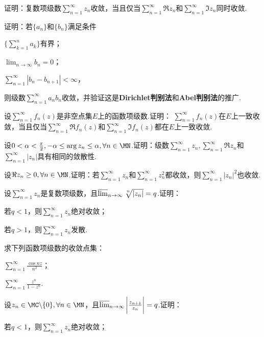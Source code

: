 \begin{xiti}
\item 证明：复数项级数$\sum_{n=1}^\infty z_n$收敛，当且仅当$\sum_{n=1}^\infty \Re  z_n$和$\sum_{n=1}^\infty \Im z_n$同时收敛.
\item 证明：若$\{a_n\}$和$\{b_n\}$满足条件
\begin{enuma}
  \item $\bigg\{\sum_{k=1}^n a_k\bigg\}$有界；
  \item $\lim_{n\to\infty}b_n=0$；
  \item $\sum_{n=1}^\infty|b_n-b_{n+1}|<\infty$，
\end{enuma}
则级数$\sum_{n=1}^\infty a_nb_n$收敛，并验证这是\textbf{Dirichlet判别法}和\textbf{Abel判别法}的推广.
\item 设$\sum_{n=1}^\infty f_n(z)$是非空点集$E$上的函数项级数.证明：
$\sum_{n=1}^\infty f_n(z)$在$E$上一致收敛，当且仅当$\sum_{n=1}^\infty\Re f_n(z)$和$\sum_{n=1}^\infty\Im f_n(z)$都在$E$上一致收敛.
\item 设$0<\alpha<\frac\pi2,-\alpha\le\arg z_n\le\alpha,\forall n\in \MN$.证明：级数$\sum_{n=1}^\infty z_n,\sum_{n=1}^\infty\Re z_n$和$\sum_{n=1}^\infty|z_n|$具有相同的敛散性.
\item 设$\Re z_n\ge0,\forall n\in \MN$.证明：若$\sum_{n=1}^\infty z_n$和$\sum_{n=1}^\infty z_n^2$都收敛，则$\sum_{n=1}^\infty|z_n|^2$也收敛.
\item 设$\sum_{n=1}^\infty z_n$是复数项级数，且$\varlimsup_{n\to\infty}\sqrt[\leftroot{-1}\uproot{2}n]{|z_n|}=q$.证明：
    \begin{enuma}
      \item 若$q<1$，则$\sum_{n=1}^\infty z_n$绝对收敛；
      \item 若$q>1$，则$\sum_{n=1}^\infty z_n$发散.
    \end{enuma}
\item 求下列函数项级数的收敛点集：
    \begin{enuma}
      \item $\sum_{n=1}^\infty\frac{\cos nz}{n^2}$；
      \item $\sum_{n=1}^\infty\frac{z^n}{1-z^n}$.
    \end{enuma}
\item 设$z_n\in\MC\backslash\{0\},\forall n\in \MN$，且$\varlimsup_{n\to\infty}\bigg|\frac{z_{n+1}}{z_n}\bigg|=q$.证明：
    \begin{enuma}
      \item 若$q<1$，则$\sum_{n=1}^\infty z_n$绝对收敛；

\end{enuma}
\end{xiti}
